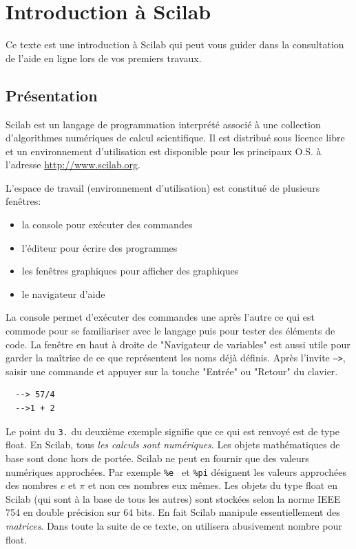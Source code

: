 

\section{Introduction à Scilab} 
Ce texte est une introduction à Scilab qui peut vous guider dans la consultation de l'aide en ligne lors de vos premiers travaux.
\subsection{Présentation}
Scilab est un langage de programmation interprété associé à une collection d'algorithmes numériques de calcul scientifique. Il est distribué sous licence libre et un environnement d'utilisation est disponible pour les principaux O.S. à l'adresse \href{http://www.scilab.org}{http://www.scilab.org}.

L'espace de travail (environnement d'utilisation) est constitué de plusieurs fenêtres:
\begin{itemize}
  \item la console pour exécuter des commandes
  \item l'éditeur pour écrire des programmes
  \item les fenêtres graphiques pour afficher des graphiques
  \item le navigateur d'aide
\end{itemize}
La console permet d'exécuter des commandes une après l'autre ce qui est commode pour se familiariser avec le langage puis pour tester des éléments de code. La fenêtre en haut à droite de "Navigateur de variables" est aussi utile pour garder la maîtrise de ce que représentent les noms déjà définis.\newline 
Après l'invite \texttt{-->}, saisir une commande et appuyer sur la touche "Entrée" ou "Retour" du clavier.
\begin{verbatim}
  --> 57/4
  -->1 + 2
\end{verbatim}
Le point du \texttt{3.} du deuxième exemple signifie que ce qui est renvoyé est de type float. En Scilab, tous \emph{les calculs sont numériques}. Les objets mathématiques de base sont donc hors de portée. Scilab ne peut en fournir que des valeurs numériques approchées. Par exemple \texttt{\%e } et \texttt{\%pi} désignent les valeurs approchées des nombres $e$ et $\pi$ et non ces nombres eux mêmes. Les objets du type float en Scilab (qui sont à la base de tous les autres) sont stockées selon la norme IEEE 754 en double précision sur 64 bits. En fait Scilab manipule essentiellement des \emph{matrices}. Dans toute la suite de ce texte, on utilisera abusivement nombre pour float.

